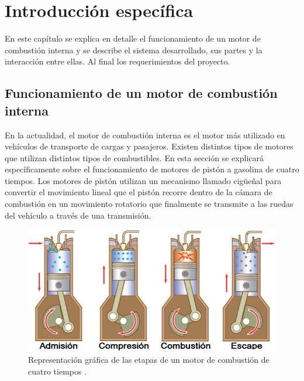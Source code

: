 \chapter{Introducción específica} %

\label{Chapter2}

En este capítulo se explica en detalle el funcionamiento de un motor de combustión interna y se describe el sistema desarrollado, sus partes y la interacción entre ellas. Al final los requerimientos del proyecto.

\section{Funcionamiento de un motor de combustión interna} \label{func-motor}

En la actualidad, el motor de combustión interna es el motor más utilizado en vehículos de transporte de cargas y pasajeros. Existen distintos tipos de motores que utilizan distintos tipos de combustibles. En esta sección se explicará específicamente sobre el funcionamiento de motores de pistón a gasolina de cuatro tiempos. Los motores de pistón utilizan un mecanismo llamado cigüeñal para convertir el movimiento lineal que el pistón recorre dentro de la cámara de combustión en un movimiento rotatorio que finalmente se transmite a las ruedas del vehículo a través de una transmisión.
\vfill
\begin{figure}[htpb]
\centering
\includegraphics[width=.9\textwidth]{./Figures/motor-combustion.png}
\caption{Representación gráfica de las etapas de un motor de combustión de cuatro tiempos \protect\footnotemark[2].}
\label{fig:motor-combustion}
\end{figure}

